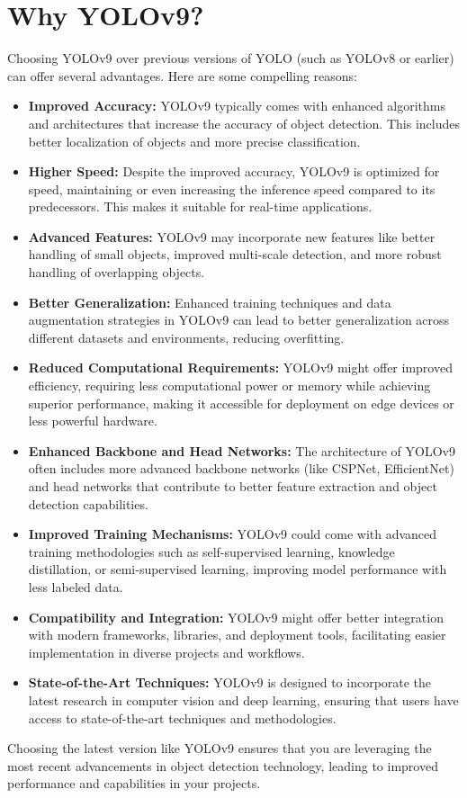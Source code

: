 \section{Why YOLOv9?}
    Choosing YOLOv9 over previous versions of YOLO (such as YOLOv8 or earlier) can offer several advantages. Here are some compelling reasons:
    \begin{itemize}
        \item \textbf{Improved Accuracy:} YOLOv9 typically comes with enhanced algorithms and architectures that increase the accuracy of object detection. This includes better localization of objects and more precise classification.
        \item \textbf{Higher Speed:} Despite the improved accuracy, YOLOv9 is optimized for speed, maintaining or even increasing the inference speed compared to its predecessors. This makes it suitable for real-time applications.
        \item \textbf{Advanced Features:} YOLOv9 may incorporate new features like better handling of small objects, improved multi-scale detection, and more robust handling of overlapping objects.
        \item \textbf{Better Generalization:} Enhanced training techniques and data augmentation strategies in YOLOv9 can lead to better generalization across different datasets and environments, reducing overfitting.
        \item \textbf{Reduced Computational Requirements:} YOLOv9 might offer improved efficiency, requiring less computational power or memory while achieving superior performance, making it accessible for deployment on edge devices or less powerful hardware.
        \item \textbf{Enhanced Backbone and Head Networks:} The architecture of YOLOv9 often includes more advanced backbone networks (like CSPNet, EfficientNet) and head networks that contribute to better feature extraction and object detection capabilities.
        \item \textbf{Improved Training Mechanisms:} YOLOv9 could come with advanced training methodologies such as self-supervised learning, knowledge distillation, or semi-supervised learning, improving model performance with less labeled data.
        \item \textbf{Compatibility and Integration:} YOLOv9 might offer better integration with modern frameworks, libraries, and deployment tools, facilitating easier implementation in diverse projects and workflows.
        \item \textbf{State-of-the-Art Techniques:} YOLOv9 is designed to incorporate the latest research in computer vision and deep learning, ensuring that users have access to state-of-the-art techniques and methodologies.
    \end{itemize}
    Choosing the latest version like YOLOv9 ensures that you are leveraging the most recent advancements in object detection technology, leading to improved performance and capabilities in your projects.

